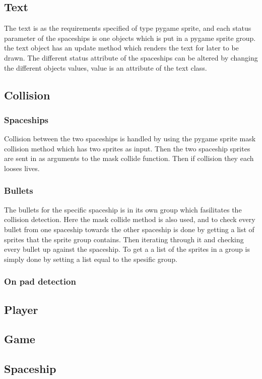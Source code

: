 \documentclass{article}
\begin{document}
\subsection{Text}
The text is as the requirements specified of type pygame sprite, and each status parameter of the spaceships is one objects which is put in a pygame sprite group. the text object has an update method which renders the text for later to be drawn. The different status attribute of the spaceships can be altered by changing the different objects values, value is an attribute of the text class.
\subsection{Collision}
\subsubsection{Spaceships}
Collision between the two spaceships is handled by using the pygame sprite mask collision method which has two sprites as input. Then the two spaceship sprites are sent in as arguments to the mask collide function. Then if collision they each looses lives.
\subsubsection{Bullets}
The bullets for the specific spaceship is in its own group which fasilitates the collision detection. Here the mask collide method is also used, and to check every bullet from one spaceship towards the other spaceship is done by getting a list of sprites that the sprite group contains. Then iterating through it and checking every bullet up against the spaceship. To get a a list of the sprites in a group is simply done by setting a list equal to the spesific group.
\subsubsection{On pad detection}
\subsection{Player}
\subsection{Game}
\subsection{Spaceship}
\end{document}
